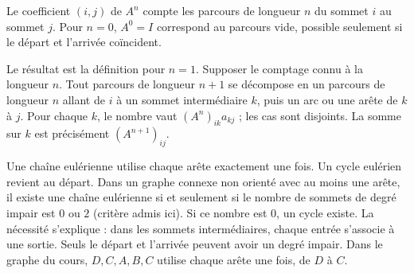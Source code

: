 \begin{theoreme}
Le coefficient $(i,j)$ de $A^n$ compte les parcours de longueur $n$ du sommet $i$ au sommet $j$.
Pour $n=0$, $A^0=I$ correspond au parcours vide, possible seulement si le départ et l'arrivée coïncident.
\end{theoreme}
\begin{demonstration}
Le résultat est la définition pour $n=1$. Supposer le comptage connu à la longueur $n$.
Tout parcours de longueur $n+1$ se décompose en un parcours de longueur $n$ allant de $i$ à un sommet intermédiaire $k$, puis un arc ou une arête de $k$ à $j$.
Pour chaque $k$, le nombre vaut $(A^n)_{ik}a_{kj}$ ; les cas sont disjoints. La somme sur $k$ est précisément $(A^{n+1})_{ij}$.
\end{demonstration}
Une chaîne eulérienne utilise chaque arête exactement une fois. Un cycle eulérien revient au départ.
Dans un graphe connexe non orienté avec au moins une arête, il existe une chaîne eulérienne si et seulement si le nombre de sommets de degré impair est $0$ ou $2$ (critère admis ici). Si ce nombre est $0$, un cycle existe.
La nécessité s'explique : dans les sommets intermédiaires, chaque entrée s'associe à une sortie. Seuls le départ et l'arrivée peuvent avoir un degré impair.
Dans le graphe du cours, $D,C,A,B,C$ utilise chaque arête une fois, de $D$ à $C$.

